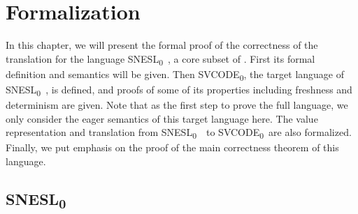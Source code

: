 
\def\fmsnesl{SNESL\textsubscript{0}}
\def\fmsvcode{SVCODE\textsubscript{0}}



\def\seval#1#2#3#4#5{\left\langle#1,#2 \right\rangle \Da^{#3} #4 \ \$ \ #5} 
\def\sevalf#1#2#3#4{{\lcall}(#1,...,#2) \Da^{#3} #4}
\def\sevalfg#1#2#3#4{#1(#2) \Da^{#3} #4}

\def\Eval#1#2#3#4{#1 \Env #2 \Eva #3 \ \$ \ #4 } 


\def\Type#1#2#3{#1 \Env #2 : #3 } 
\def\Typef#1#2#3{#1 : (#2) \rightarrow #3}
\def\TypeV#1#2{#1 : #2}

\def\ValRep#1#2#3{ #1 \triangleright_{#2} #3}


\def\Vtransb#1#2#3#4{#1 \triangleleft_{#2} #3,#4}

\def\wf#1#2#3{ #2 \Vdash #1 : #3} %


\def\etail#1#2{\< #1 | \ #2 \ \'>}  %

\def\PRName#1{\textsc{I-#1}}
\def\MI{\mathcal{I}}  %


\def\ConEq#1{\xlongequal{#1}}  %

\chapter{Formalization}


In this chapter, we will present the formal proof of the correctness of the translation for the language \fmsnesl \ , a core subset of \mysnesl.
First its formal definition and semantics will be given.
Then \fmsvcode, the target language of \fmsnesl \ , is defined, and proofs of some of its properties including freshness and determinism are given.
Note that as the first step to prove the full language, we only consider the eager semantics of this target language here.
The value representation and translation from \fmsnesl \  \ to \fmsvcode \ are also formalized.
Finally, we put emphasis on the proof of the main correctness theorem of this language.



\section{\fmsnesl}

